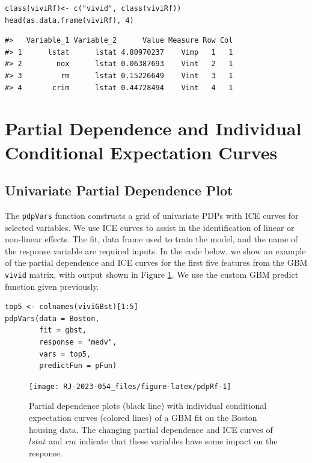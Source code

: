 \begin{verbatim}
class(viviRf)<- c("vivid", class(viviRf)) 
head(as.data.frame(viviRf), 4)
\end{verbatim}

\begin{verbatim}
#>   Variable_1 Variable_2      Value Measure Row Col
#> 1      lstat      lstat 4.80970237    Vimp   1   1
#> 2        nox      lstat 0.06387693    Vint   2   1
#> 3         rm      lstat 0.15226649    Vint   3   1
#> 4       crim      lstat 0.44728494    Vint   4   1
\end{verbatim}

\hypertarget{GPDP}{%
\section{Partial Dependence and Individual Conditional Expectation Curves}\label{GPDP}}

\hypertarget{univariate-partial-dependence-plot}{%
\subsection{Univariate Partial Dependence Plot}\label{univariate-partial-dependence-plot}}

The \texttt{pdpVars} function constructs a grid of univariate PDPs with ICE curves for selected variables. We use ICE curves to assist in the identification of linear or non-linear effects. The fit, data frame used to train the model, and the name of the response variable are required inputs. In the code below, we show an example of the partial dependence and ICE curves for the first five features from the GBM \texttt{vivid} matrix, with output shown in Figure \ref{fig:pdpRf}. We use the custom GBM predict function given previously.

\begin{verbatim}
top5 <- colnames(viviGBst)[1:5]
pdpVars(data = Boston,
        fit = gbst,
        response = "medv",
        vars = top5,
        predictFun = pFun)
\end{verbatim}

\begin{figure}

{\centering \texttt{[image: RJ-2023-054\_files/figure-latex/pdpRf-1]} 

}

\caption{Partial dependence plots (black line) with individual conditional expectation curves (colored lines) of a GBM fit on the Boston housing data. The changing partial dependence and ICE curves of $lstat$ and $rm$ indicate that these variables have some impact on the response.}\label{fig:pdpRf}
\end{figure}

